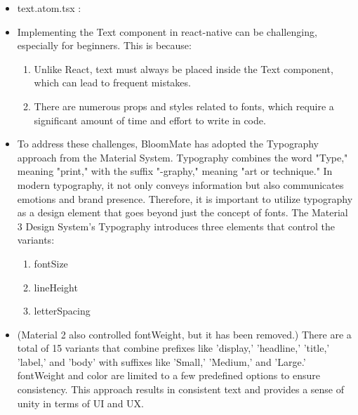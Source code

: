 \documentclass[conference, a4paper]{IEEEtran}
\begin{document}
\begin{enumerate}
\begin{enumerate}
\begin{itemize}
        \item text.atom.tsx :
        \item[] Implementing the Text component in react-native can be challenging, especially for beginners. This is because:
        \begin{enumerate}
            \item Unlike React, text must always be placed inside the Text component, which can lead to frequent mistakes.
            \item There are numerous props and styles related to fonts, which require a significant amount of time and effort to write in code.
        \end{enumerate}
        \item[] To address these challenges, BloomMate has adopted the Typography approach from the Material System. Typography combines the word "Type," meaning "print," with the suffix "-graphy," meaning "art or technique." In modern typography, it not only conveys information but also communicates emotions and brand presence. Therefore, it is important to utilize typography as a design element that goes beyond just the concept of fonts. The Material 3 Design System's Typography introduces three elements that control the variants:
        \begin{enumerate}
            \item fontSize
            \item lineHeight
            \item letterSpacing
        \end{enumerate}
        \item[] (Material 2 also controlled fontWeight, but it has been removed.) There are a total of 15 variants that combine prefixes like 'display,' 'headline,' 'title,' 'label,' and 'body' with suffixes like 'Small,' 'Medium,' and 'Large.' fontWeight and color are limited to a few predefined options to ensure consistency. This approach results in consistent text and provides a sense of unity in terms of UI and UX. \\



\end{itemize}
\end{enumerate}
\end{enumerate}
\end{document}
